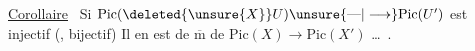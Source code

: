 \uline{Corollaire} \ Si $\mathrm{Pic}(\deleted{\unsure{X}}U)\unsure{\text{---}|\longrightarrow}\mathrm{Pic}(U')$ est injectif (, bijectif) Il en est de $\overline{\mathrm m}$ de $\mathrm{Pic}(X)\longrightarrow\mathrm{Pic}(X')$ \ldots\ .

